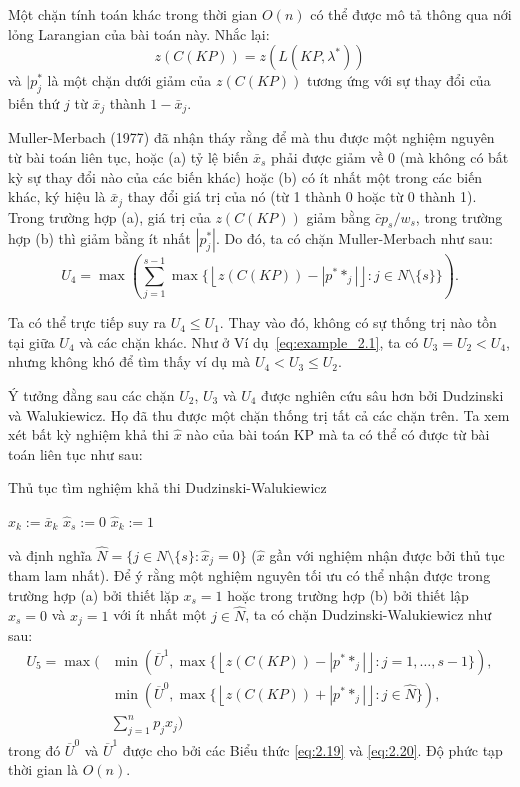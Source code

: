 Một chặn tính toán khác trong thời gian $O(n)$ có thể được mô tả thông qua nới lỏng Larangian của bài toán này. Nhắc lại:
\begin{equation*}
    z(C(KP)) = z(L(KP, \lambda^*))
\end{equation*}
và $|p_j^*$ là một chặn dưới giảm của $z(C(KP))$ tương ứng với sự thay đổi của biến thứ $j$ từ $\bar{x}_j$ thành $1 - \bar{x}_j$.

Muller-Merbach (1977) đã nhận tháy rằng để mà thu được một nghiệm nguyên từ bài toán liên tục, hoặc (a) tỷ lệ biến $\bar{x}_s$ phải được giảm về 0 (mà không có bất kỳ sự thay đổi nào của các biến khác) hoặc (b) có ít nhất một trong các biến khác, ký hiệu là $\bar{x}_j$ thay đổi giá trị của nó (từ 1 thành 0 hoặc từ 0 thành 1). Trong trường hợp (a), giá trị của $z(C(KP))$ giảm bằng $\bar{c}p_s / w_s$, trong trường hợp (b) thì giảm bằng ít nhất $|p_j^*|$. Do đó, ta có chặn Muller-Merbach như sau:
\begin{equation}
    \label{eq:2.21}
    U_4 = \max\left(\sum_{j = 1}^{s - 1}\max\{\left \lfloor z(C(KP)) - |p^**_j|\right \rfloor : j \in N \setminus \{s\}\}\right).
\end{equation}

Ta có thể trực tiếp suy ra $U_4 \leq U_1$. Thay vào đó, không có sự thống trị nào tồn tại giữa $U_4$ và các chặn khác. Như ở Ví dụ~\ref{eq:example_2.1}, ta có $U_3 = U_2 < U_4$, nhưng không khó để tìm thấy ví dụ mà $U_4 < U_3 \leq U_2$.

Ý tưởng đằng sau các chặn $U_2$, $U_3$ và $U_4$ được nghiên cứu sâu hơn bởi Dudzinski và Walukiewicz. Họ đã thu được một chặn thống trị tất cả các chặn trên. Ta xem xét bất kỳ nghiệm khả thi $\hat{x}$ nào của bài toán KP mà ta có thể có được từ bài toán liên tục như sau:
\begin{algorithm}
    \caption{Thủ tục tìm nghiệm khả thi Dudzinski-Walukiewicz}
    {
        $\hat{x}_k := \bar{x}_k$\;
    }
    $\hat{x}_s := 0$\;
    {
        {
            $\hat{x}_k := 1$
        }
    }
\end{algorithm}
và định nghĩa $\hat{N} = \{j \in N \setminus \{s\}: \hat{x}_j = 0\}$ ($\hat{x}$ gần với nghiệm nhận được bởi thủ tục tham lam nhất). Để ý rằng một nghiệm nguyên tối ưu có thể nhận được trong trường hợp (a) bởi thiết lặp $x_s = 1$ hoặc trong trường hợp (b) bởi thiết lập $x_s = 0$ và $x_j = 1$ với ít nhất một $j \in \hat{N}$, ta có chặn Dudzinski-Walukiewicz như sau:
\begin{equation}
    \begin{aligned}
        \label{eq:2.22}
        U_5 = \max(&\min(\overline{U}^1, \max\{\left \lfloor z(C(KP)) - |p^**_j|\right \rfloor : j = 1, \dots, s - 1\}),\\
        &\min(\overline{U}^0, \max\{\left \lfloor z(C(KP)) + |p^**_j|\right \rfloor : j \in \hat{N}\}),\\
        &\sum_{j=1}^np_j\hat{x}_j)
    \end{aligned}
\end{equation}
trong đó $\overline{U}^0$ và $\overline{U}^1$ được cho bởi các Biểu thức \eqref{eq:2.19}  và \eqref{eq:2.20}. Độ phức tạp thời gian là $O(n)$.

